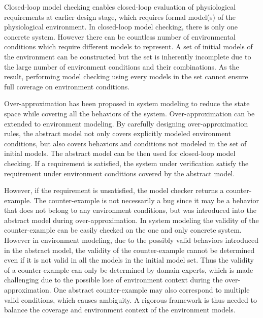 Closed-loop model checking enables closed-loop evaluation of physiological requirements at earlier design stage, which requires formal model(s) of the physiological environment. 
In closed-loop model checking, there is only one concrete system. However there can be countless number of environmental conditions which require different models to represent. A set of initial models of the environment can be constructed but the set is inherently incomplete due to the large number of environment conditions and their combinations. As the result, performing model checking using every models in the set cannot ensure full coverage on environment conditions. 

Over-approximation has been proposed in system modeling to reduce the state space while covering all the behaviors of the system. Over-approximation can be extended to environment modeling. By carefully designing over-approximation rules, the abstract model not only covers explicitly modeled environment conditions, but also covers behaviors and conditions not modeled in the set of initial models. The abstract model can be then used for closed-loop model checking. If a requirement is satisfied, the system under verification satisfy the requirement under environment conditions covered by the abstract model. 

However, if the requirement is unsatisfied, the model checker returns a counter-example. The counter-example is not necessarily a bug since it may be a behavior that does not belong to any environment conditions, but was introduced into the abstract model during over-approximation. In system modeling the validity of the counter-example can be easily checked on the one and only concrete system. However in environment modeling, due to the possibly valid behaviors introduced in the abstract model, the validity of the counter-example cannot be determined even if it is not valid in all the models in the initial model set. Thus the validity of a counter-example can only be determined by domain experts, which is made challenging due to the possible lose of environment context during the over-approximation. One abstract counter-example may also correspond to multiple valid conditions, which causes ambiguity. A rigorous framework is thus needed to balance the coverage and environment context of the environment models.

